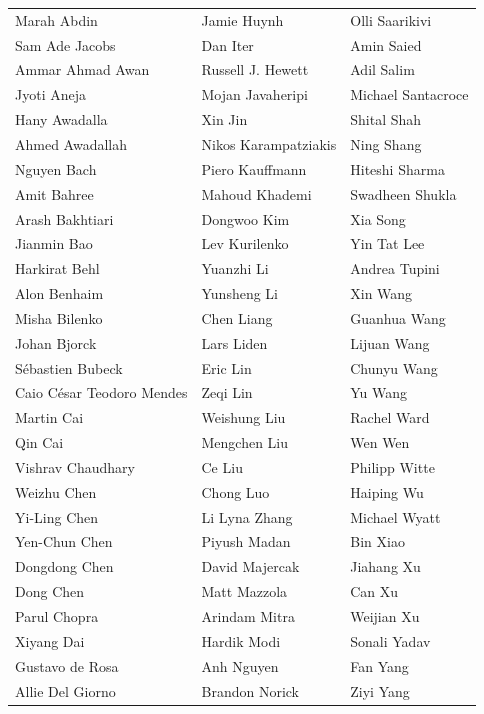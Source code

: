 \documentclass[11pt]{article}
\begin{document}
\begin{tabular}{>{\raggedright\arraybackslash}p{5cm} 
                 >{\raggedright\arraybackslash}p{5cm} 
                 >{\raggedright\arraybackslash}p{5cm}}
Marah Abdin & Jamie Huynh & Olli Saarikivi \\ 
Sam Ade Jacobs & Dan Iter & Amin Saied \\ 
Ammar Ahmad Awan & Russell J. Hewett & Adil Salim \\ 
Jyoti Aneja & Mojan Javaheripi & Michael Santacroce \\ 
Hany Awadalla & Xin Jin & Shital Shah \\ 
Ahmed Awadallah & Nikos Karampatziakis & Ning Shang \\ 
Nguyen Bach & Piero Kauffmann & Hiteshi Sharma \\ 
Amit Bahree & Mahoud Khademi & Swadheen Shukla \\ 
Arash Bakhtiari & Dongwoo Kim & Xia Song \\ 
Jianmin Bao & Lev Kurilenko & Yin Tat Lee \\ 
Harkirat Behl & Yuanzhi Li & Andrea Tupini \\ 
Alon Benhaim & Yunsheng Li & Xin Wang \\ 
Misha Bilenko & Chen Liang & Guanhua Wang \\ 
Johan Bjorck & Lars Liden & Lijuan Wang \\ 
S\'ebastien Bubeck & Eric Lin & Chunyu Wang \\ 
Caio C\'esar Teodoro Mendes & Zeqi Lin & Yu Wang \\ 
Martin Cai & Weishung Liu & Rachel Ward \\ 
Qin Cai & Mengchen Liu & Wen Wen \\ 
Vishrav Chaudhary & Ce Liu & Philipp Witte \\ 
Weizhu Chen & Chong Luo & Haiping Wu \\ 
Yi-Ling Chen & Li Lyna Zhang & Michael Wyatt \\ 
Yen-Chun Chen & Piyush Madan & Bin Xiao \\ 
Dongdong Chen & David Majercak & Jiahang Xu \\ 
Dong Chen & Matt Mazzola & Can Xu \\ 
Parul Chopra & Arindam Mitra & Weijian Xu \\ 
Xiyang Dai & Hardik Modi & Sonali Yadav \\ 
Gustavo de Rosa & Anh Nguyen & Fan Yang \\ 
Allie Del Giorno & Brandon Norick & Ziyi Yang \\ 

\end{tabular}
\end{document}
